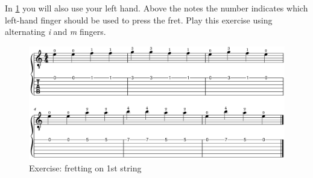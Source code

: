 In \ref{fig:exercise_fretting_fingering_first_string} you will also use your left hand. Above the notes the number indicates which left-hand finger should be used to press the fret. Play this exercise using alternating \textit{i} and \textit{m} fingers. 

\begin{figure}[h]
    \centering
    \includegraphics[width=\textwidth]{../MuseScore/Guitar/FirstStringFingers.png}
    \caption{Exercise: fretting on 1st string}
    \label{fig:exercise_fretting_fingering_first_string}
\end{figure}